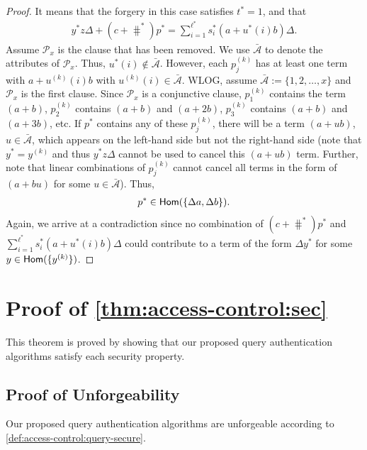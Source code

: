 \begin{proof}
It means that the forgery in this case satisfies $t^\ast =1$, and that
\begin{align*}
  y^\ast z  \Delta + (c + \hash^\ast)p^\ast = \sum_{i=1}^{\ell^\ast} s^\ast_i (a+u^\ast(i)b)\Delta.
\end{align*}
Assume $\mathcal{P}_x$ is the clause that has been removed. We use $\bar{\mathcal{A}}$ to denote the attributes of $\mathcal{P}_x$. Thus, $u^\ast(i) \notin \bar{\mathcal{A}}$. However, each $p_{j}^{(k)}$ has at least one term with $a + u^{(k)}(i)b$ with $u^{(k)}(i) \in \bar{\mathcal{A}}$. WLOG, assume $\bar{\mathcal{A}}:=\{1,2, \dots, x\}$ and $\mathcal{P}_x$ is the first clause. Since $\mathcal{P}_x$ is a conjunctive clause, $p^{(k)}_1$ contains the term $(a+b)$, $p^{(k)}_2$ contains $(a+b)$ and $(a+2b)$, $p^{(k)}_3$ contains $(a+b)$ and $(a+3b)$, etc. If $p^\ast$ contains any of these $p^{(k)}_{j}$, there will be a term $(a+ub)$, $u\in\bar{\mathcal{A}}$, which appears on the left-hand side but not the right-hand side (note that $y^{\ast} = y^{(k)}$ and thus $y^\ast z \Delta$ cannot be used to cancel this $(a+ub)$ term. Further, note that linear combinations of $p^{(k)}_j$ cannot cancel all terms in the form of $(a+bu)$ for some $u \in \bar{\mathcal{A}}$). Thus,
\begin{align*}
  p^\ast \in \textsf{Hom}( \{\Delta a, \Delta b\} ).
\end{align*}
Again, we arrive at a contradiction since no combination of $(c+\hash^\ast)p^\ast$ and $\sum_{i=1}^{\ell^\ast} s^\ast_i (a+u^\ast(i)b)\Delta$ could contribute to a term of the form $\Delta y^\ast$ for some $y\in \textsf{Hom}(\{y^{(k)}\})$.
\end{proof}

\chapter{Proof of \texorpdfstring{\cref*{thm:access-control:sec}}{Theorem~\ref{thm:access-control:sec}}}%
\label{app:access-control-sec}

\querysecuritytheorem*

This theorem is proved by showing that our proposed query authentication algorithms satisfy each security property.

\section{Proof of Unforgeability}

\begin{lemma}\label{lemma:access-control:query-secure}
  Our proposed query authentication algorithms are unforgeable according to \cref{def:access-control:query-secure}.
\end{lemma}

